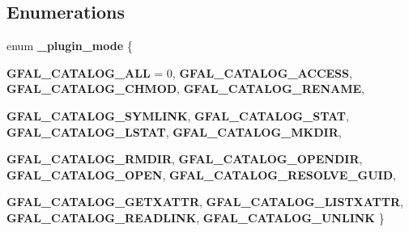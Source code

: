 \subsection*{Enumerations}
\begin{CompactItemize}
\item 
enum \textbf{\_\-plugin\_\-mode} \{ \par
\textbf{GFAL\_\-CATALOG\_\-ALL} = 0, 
\textbf{GFAL\_\-CATALOG\_\-ACCESS}, 
\textbf{GFAL\_\-CATALOG\_\-CHMOD}, 
\textbf{GFAL\_\-CATALOG\_\-RENAME}, 
\par
\textbf{GFAL\_\-CATALOG\_\-SYMLINK}, 
\textbf{GFAL\_\-CATALOG\_\-STAT}, 
\textbf{GFAL\_\-CATALOG\_\-LSTAT}, 
\textbf{GFAL\_\-CATALOG\_\-MKDIR}, 
\par
\textbf{GFAL\_\-CATALOG\_\-RMDIR}, 
\textbf{GFAL\_\-CATALOG\_\-OPENDIR}, 
\textbf{GFAL\_\-CATALOG\_\-OPEN}, 
\textbf{GFAL\_\-CATALOG\_\-RESOLVE\_\-GUID}, 
\par
\textbf{GFAL\_\-CATALOG\_\-GETXATTR}, 
\textbf{GFAL\_\-CATALOG\_\-LISTXATTR}, 
\textbf{GFAL\_\-CATALOG\_\-READLINK}, 
\textbf{GFAL\_\-CATALOG\_\-UNLINK}
 \}
\end{CompactItemize}

